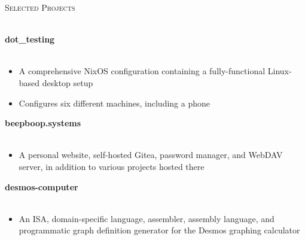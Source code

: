 \documentclass{article}
\newcommand{\lineunder} {
    \vspace*{-8pt} \\
    \hspace*{-18pt} \hrulefill \\
}
\newcommand{\header} [1] {
    {\hspace*{-18pt}\vspace*{6pt} \textsc{#1}}
    \vspace*{-6pt} \lineunder
}
\newcommand{\workexp} [4] {
	\hspace*{-18pt} \textbf{#1} \hfill #2\\
	\hspace*{-18pt} \textit{#3} \hfill #4\\
	\vspace{-1mm}
}
\begin{document}
\header{Selected Projects}
\vspace{1mm}

\workexp{dot\_testing}{}{}{}
\vspace{-6mm}
\begin{itemize} \itemsep 0.5pt
	\item A comprehensive NixOS configuration containing a fully-functional Linux-based desktop setup
	\item Configures six different machines, including a phone
\end{itemize}

\vspace{-2mm}

\workexp{beepboop.systems}{}{}{}
\vspace{-6mm}
\begin{itemize} \itemsep 0.5pt
	\item A personal website, self-hosted Gitea, password manager, and WebDAV server, in addition to various projects hosted there
\end{itemize}

\vspace{-2mm}

\workexp{desmos-computer}{}{}{}
\vspace{-6mm}
\begin{itemize} \itemsep 0.5pt
	\item An ISA, domain-specific language, assembler, assembly language, and programmatic graph definition generator for the Desmos graphing calculator
\end{itemize}
\end{document}
